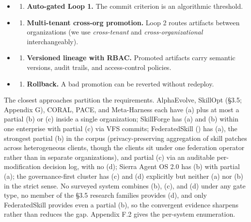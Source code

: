 \documentclass[
]{article}
\providecommand{\tightlist}{%
  \setlength{\itemsep}{0pt}\setlength{\parskip}{0pt}}
\begin{document}
\begin{itemize}
\tightlist
\item
  \begin{enumerate}
  \def\labelenumi{(\alph{enumi})}
  \tightlist
  \item
    \textbf{Auto-gated Loop 1.} The commit criterion is an algorithmic
    threshold.
  \end{enumerate}
\item
  \begin{enumerate}
  \def\labelenumi{(\alph{enumi})}
  \setcounter{enumi}{1}
  \tightlist
  \item
    \textbf{Multi-tenant cross-org promotion.} Loop 2 routes artifacts
    between organizations (we use \emph{cross-tenant} and
    \emph{cross-organizational} interchangeably).
  \end{enumerate}
\item
  \begin{enumerate}
  \def\labelenumi{(\alph{enumi})}
  \setcounter{enumi}{2}
  \tightlist
  \item
    \textbf{Versioned lineage with RBAC.} Promoted artifacts carry
    semantic versions, audit trails, and access-control policies.
  \end{enumerate}
\item
  \begin{enumerate}
  \def\labelenumi{(\alph{enumi})}
  \setcounter{enumi}{3}
  \tightlist
  \item
    \textbf{Rollback.} A bad promotion can be reverted without redeploy.
  \end{enumerate}
\end{itemize}

The closest approaches partition the requirements. AlphaEvolve, SkillOpt
(§3.5; Appendix G), CORAL, PACE, and Meta-Harness each have (a) plus at
most a partial (b) or (c) inside a single organization; SkillForge has
(a) and (b) within one enterprise with partial (c) via VFS commits;
FederatedSkill () has (a), the strongest partial (b) in the corpus
(privacy-preserving aggregation of skill patches across heterogeneous
clients, though the clients sit under one federation operator rather
than in separate organizations), and partial (c) via an auditable
per-modification decision log, with no (d); Sierra Agent OS 2.0 has (b)
with partial (a); the governance-first cluster has (c) and (d)
explicitly but neither (a) nor (b) in the strict sense. No surveyed
system combines (b), (c), and (d) under any gate type, no member of the
§3.5 research families provides (d), and only FederatedSkill provides
even a partial (b), so the convergent evidence sharpens rather than
reduces the gap. Appendix F.2 gives the per-system enumeration.
\end{document}
